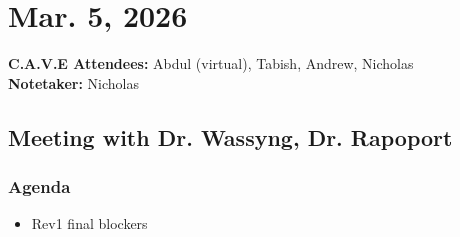 	\pagebreak
	\section*{Mar. 5, 2026}

	\textbf{C.A.V.E Attendees:} Abdul (virtual), Tabish, Andrew, Nicholas\\
	\textbf{Notetaker:} Nicholas

	\subsection*{Meeting with Dr. Wassyng, Dr. Rapoport}
		\subsubsection*{Agenda}
			\begin{itemize}
				\item Rev1 final blockers
			\end{itemize}

